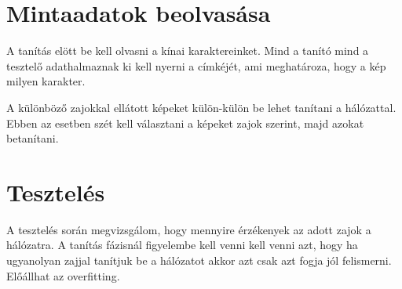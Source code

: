 \section{Mintaadatok beolvasása}

A tanítás elött be kell olvasni a kínai karaktereinket. Mind a tanító mind a tesztelő adathalmaznak ki kell nyerni a címkéjét, ami meghatároza, hogy a kép milyen karakter.

A különböző zajokkal ellátott képeket külön-külön be lehet tanítani a hálózattal. Ebben az esetben szét kell választani a képeket zajok szerint, majd azokat betanítani.

\newpage

\section{Tesztelés}

A tesztelés során megvizsgálom, hogy mennyire érzékenyek az adott zajok a hálózatra. A tanítás fázisnál figyelembe kell venni kell venni azt, hogy ha ugyanolyan zajjal tanítjuk be a  hálózatot akkor azt csak azt fogja jól felismerni. Előállhat az overfitting.

